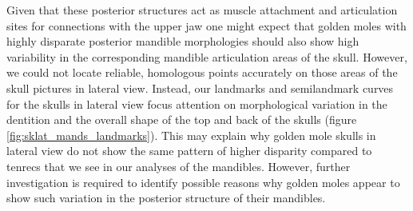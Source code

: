 \documentclass[12pt,a4paper]{article}
\begin{document}
		
			
	 Given that these posterior structures act as muscle attachment and articulation sites for connections with the upper jaw %
	 one might expect that golden moles with highly disparate posterior mandible morphologies should also show high variability in the corresponding mandible articulation areas of the skull. However, we could not locate reliable, homologous points accurately on those areas of the skull pictures in lateral view. Instead, our landmarks and semilandmark curves for the skulls in lateral view focus attention on morphological variation in the dentition and the overall shape of the top and back of the skulls (figure \ref{fig:sklat_mands_landmarks}). This may explain why golden mole skulls in lateral view do not show the same pattern of higher disparity compared to tenrecs that we see in our analyses of the mandibles. However, further investigation is required to identify possible reasons why golden moles appear to show such variation in the posterior structure of their mandibles.
	 	
	
	
\end{document}

